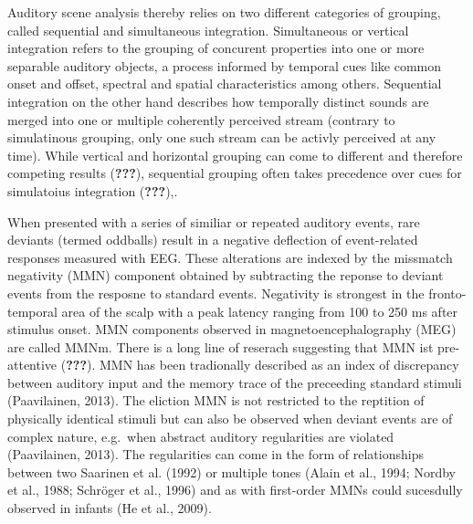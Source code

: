 \documentclass[stu,a4paper,11pt,floatsintext]{apa7}
\begin{document}
Auditory scene analysis thereby relies on two different categories of
grouping, called sequential and simultaneous integration. Simultaneous
or vertical integration refers to the grouping of concurent properties
into one or more separable auditory objects, a process informed by
temporal cues like common onset and offset, spectral and spatial
characteristics among others. Sequential integration on the other hand
describes how temporally distinct sounds are merged into one or multiple
coherently perceived stream (contrary to simulatinous grouping, only one
such stream can be activly perceived at any time). While vertical and
horizontal grouping can come to different and therefore competing
results ({\textbf{???}}), sequential grouping often takes precedence
over cues for simulatoius integration ({\textbf{???}}),.

When presented with a series of similiar or repeated auditory events,
rare deviants (termed oddballs) result in a negative deflection of
event-related responses measured with EEG. These alterations are indexed
by the missmatch negativity (MMN) component obtained by subtracting the
reponse to deviant events from the resposne to standard events.
Negativity is strongest in the fronto-temporal area of the scalp with a
peak latency ranging from 100 to 250 ms after stimulus onset. MMN
components observed in magnetoencephalography (MEG) are called MMNm.
There is a long line of reserach suggesting that MMN ist pre-attentive
({\textbf{???}}). MMN has been tradionally described as an index of
discrepancy between auditory input and the memory trace of the
preceeding standard stimuli (Paavilainen, 2013). The eliction MMN is not
restricted to the reptition of physically identical stimuli but can also
be observed when deviant events are of complex nature, e.g.~when
abstract auditory regularities are violated (Paavilainen, 2013). The
regularities can come in the form of relationships between two Saarinen
et al. (1992) or multiple tones (Alain et al., 1994; Nordby et al.,
1988; Schröger et al., 1996) and as with first-order MMNs could
sucesdully observed in infants (He et al., 2009).
\end{document}
